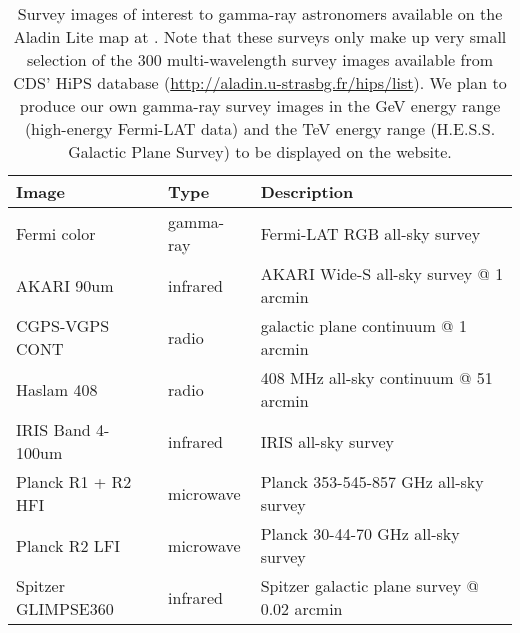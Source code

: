 \begin{table}[bt]

\caption{
Survey images of interest to gamma-ray astronomers available on the Aladin Lite map at \gammasky . Note that these surveys only make up very small selection of the 300 multi-wavelength survey images available from CDS' HiPS database (\protect\url{http://aladin.u-strasbg.fr/hips/list}). We plan to produce our own gamma-ray survey images in the GeV energy range (high-energy Fermi-LAT data) and the TeV energy range (H.E.S.S. Galactic Plane Survey) to be displayed on the website.
}

\label{tab:images}
{}\begin{tabular}{ lll }
\hline
Image & Type & Description\\
\hline
Fermi color & gamma-ray & Fermi-LAT RGB all-sky survey\\
AKARI 90um & infrared & AKARI Wide-S all-sky survey @ 1 arcmin\\
CGPS-VGPS CONT & radio & galactic plane continuum @ 1 arcmin\\
Haslam 408 & radio & 408 MHz all-sky continuum @ 51 arcmin\\
IRIS Band 4-100um & infrared & IRIS all-sky survey\\
Planck R1 + R2 HFI & microwave & Planck 353-545-857 GHz all-sky survey\\
Planck R2 LFI & microwave & Planck 30-44-70 GHz all-sky survey\\
Spitzer GLIMPSE360 & infrared & Spitzer galactic plane survey @ 0.02 arcmin\\
\hline
\end{tabular}

\end{table}
